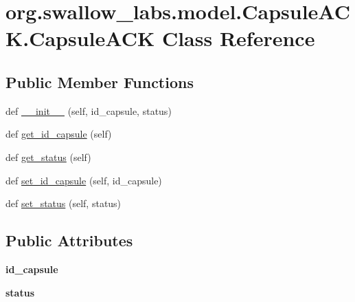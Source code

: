 \hypertarget{classorg_1_1swallow__labs_1_1model_1_1_capsule_a_c_k_1_1_capsule_a_c_k}{}\section{org.\+swallow\+\_\+labs.\+model.\+Capsule\+A\+C\+K.\+Capsule\+A\+C\+K Class Reference}
\label{classorg_1_1swallow__labs_1_1model_1_1_capsule_a_c_k_1_1_capsule_a_c_k}
\subsection*{Public Member Functions}
\begin{DoxyCompactItemize}
\item 
def \hyperlink{classorg_1_1swallow__labs_1_1model_1_1_capsule_a_c_k_1_1_capsule_a_c_k_adef5c6fa853ccd00b47351dc6593e204}{\+\_\+\+\_\+init\+\_\+\+\_\+} (self, id\+\_\+capsule, status)
\item 
def \hyperlink{classorg_1_1swallow__labs_1_1model_1_1_capsule_a_c_k_1_1_capsule_a_c_k_abe7270611aea2098362a5d6a26c2a4f4}{get\+\_\+id\+\_\+capsule} (self)
\item 
def \hyperlink{classorg_1_1swallow__labs_1_1model_1_1_capsule_a_c_k_1_1_capsule_a_c_k_a6a4ed2f6044656fa1e1e0b238dfc1c88}{get\+\_\+status} (self)
\item 
def \hyperlink{classorg_1_1swallow__labs_1_1model_1_1_capsule_a_c_k_1_1_capsule_a_c_k_a100f09ea23b957568fc02db0755f095b}{set\+\_\+id\+\_\+capsule} (self, id\+\_\+capsule)
\item 
def \hyperlink{classorg_1_1swallow__labs_1_1model_1_1_capsule_a_c_k_1_1_capsule_a_c_k_a28c38279b40e13e8f24f053b3e2f863c}{set\+\_\+status} (self, status)
\end{DoxyCompactItemize}
\subsection*{Public Attributes}
\begin{DoxyCompactItemize}
\item 
\hypertarget{classorg_1_1swallow__labs_1_1model_1_1_capsule_a_c_k_1_1_capsule_a_c_k_a5e9e3ae752888459429ad5fa12d2dffa}{}{\bfseries id\+\_\+capsule}\label{classorg_1_1swallow__labs_1_1model_1_1_capsule_a_c_k_1_1_capsule_a_c_k_a5e9e3ae752888459429ad5fa12d2dffa}

\item 
\hypertarget{classorg_1_1swallow__labs_1_1model_1_1_capsule_a_c_k_1_1_capsule_a_c_k_a0836e64d5e775dd0749b670ae38a9ea3}{}{\bfseries status}\label{classorg_1_1swallow__labs_1_1model_1_1_capsule_a_c_k_1_1_capsule_a_c_k_a0836e64d5e775dd0749b670ae38a9ea3}

\end{DoxyCompactItemize}


